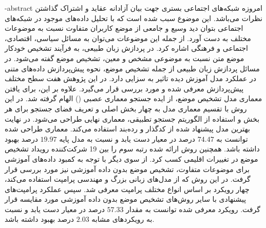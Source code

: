 

\fa-abstract{
امروزه شبکه‌های اجتماعی بستری جهت بیان آزادانه عقاید و اشتراک گذاشتن نظرات می‌باشد. این موضوع سبب شده است که با تحلیل دادە‌های موجود در شبکه‌های اجتماعی بتوان دید وسیع و جامعی از موضع‌ کاربران متفاوت نسبت به موضوعات مختلف به دست آورد. از جمله این موضوعات می‌توان به مسائل سیاسی، اقتصادی، اجتماعی و فرهنگی اشاره کرد. در پردازش زبان طبیعی، به فرآیند تشخیص خودکار موضع متن نسبت به موضوعی مشخص و معین، تشخیص موضع گفته می‌شود. 
\newline
در مسائل پردازش زبان طبیعی از جمله تشخیص موضع، نحوه پیش‌پردازش داده‌های متنی در عملکرد مدل آموزش دیده تاثیر به سزایی دارد. در این پژوهش هفت سطح مختلف پیش‌پردازش معرفی شده و مورد بررسی قرار می‌گیرد. علاوه بر این، برای یافتن معماری مدل تشخیص موضع، از ایده جستجو معماری عصبی () الهام گرفته شد. در این روش با تقسیم معماری مدل به چهار بخش اصلی و تعریف فضای جستجو برای هر بخش و استفاده از الگوریتم‌ جستجو تطبیقی، معماری نهایی طراحی می‌شود. در نهایت بهترین مدل پیشنهاد شده از کدگذار
و رده‌بند 
استفاده می‌کند. 
معماری طراحی شده توانست به
$74.47$
درصد در معیار 
دست یابد و نسبت به مدل پایه
$19.97$
درصد بهبود داشته باشد. همچنین روش ارائه شده رتبه سوم را بین 19 شرکت‌کننده رویداد تشخیص موضع در تغییرات اقلیمی کسب کرد. 
از سوی دیگر با توجه به کمبود داده‌های آموزشی برای موضوعات متفاوت، تشخیص موضع بدون داده آموزشی نیز مورد بررسی قرار گرفت. در این روش که از مدل‌های زبانی بزرگ و مهندسی پرامپت استفاده می‌کند، چهار رویکرد بر اساس انواع مختلف پرامپت معرفی شد. سپس عملکرد پرامپت‌های پیشنهادی با سایر روش‌های تشخیص موضع بدون داده آموزشی مورد مقایسه قرار گرفت. رویکرد معرفی شده توانست به مقدار 
$57.33$
درصد در معیار 
دست یابد و نسبت به رویکرد‌های مشابه
$2.03$
درصد بهبود داشته باشد.}
\abstractPage
\newpage\clearpage

